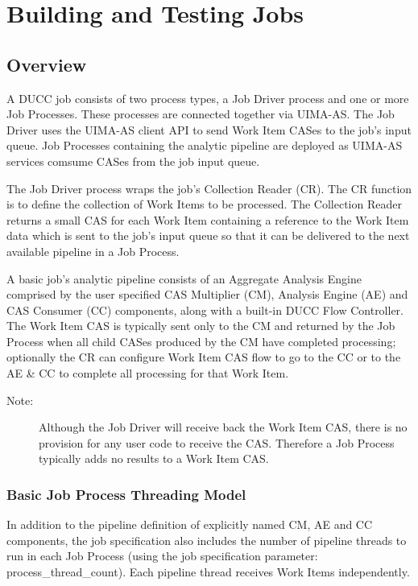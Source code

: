 \chapter{Building and Testing Jobs}

\section{Overview}

A DUCC job consists of two process types, a Job Driver process and one or more
Job Processes. These processes are connected together via UIMA-AS.
The Job Driver uses the UIMA-AS client API to send Work Item CASes 
to the job's input queue. Job Processes containing the analytic pipeline are deployed
as UIMA-AS services comsume CASes from the job input queue.

The Job Driver process wraps the job's Collection Reader (CR). The CR
function is to define the collection of Work Items to be processed.
The Collection Reader returns a small CAS for each Work Item containing a
reference to the Work Item data which is sent to the job's
input queue so that it can be delivered to the next available pipeline in a Job Process.

A basic job's analytic pipeline consists of an Aggregate Analysis Engine comprised by
the user specified CAS Multiplier (CM), Analysis Engine (AE) and CAS
Consumer (CC) components, along with a built-in DUCC Flow Controller.
The Work Item CAS is typically sent only to the CM and returned by
the Job Process when all child CASes produced by the CM have completed
processing; optionally the CR can configure Work Item CAS flow to go to the CC 
or to the AE \& CC to complete all processing for that Work Item.

	\begin{description}
	    \item[Note:] Although the Job Driver will receive back the Work Item CAS, 
	    there is no provision for any user code to receive the CAS. Therefore a
		Job Process typically adds no results to a Work Item CAS.
	\end{description}

   \subsection{Basic Job Process Threading Model}
   In addition to the pipeline definition of explicitly named CM, AE and CC components, the job
   specification also includes the number of pipeline threads to run in each
   Job Process (using the job specification parameter: process\_thread\_count).
   Each pipeline thread receives Work Items independently.

